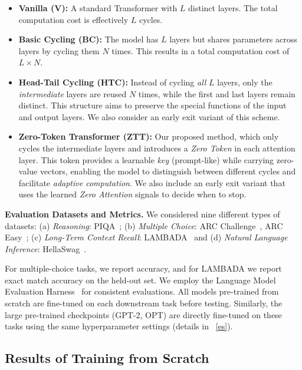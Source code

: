 \begin{itemize}[leftmargin=*]
    \item \textbf{Vanilla (V):} A standard Transformer with $L$ distinct layers. The total computation cost is effectively $L$ cycles.
    \item \textbf{Basic Cycling (BC):} The model has $L$ layers but shares parameters across layers by cycling them $N$ times. This results in a total computation cost of $L \times N$. 
    \item \textbf{Head-Tail Cycling (HTC):} Instead of cycling \emph{all} $L$ layers, only the \emph{intermediate} layers are reused $N$ times, while the first and last layers remain distinct. This structure aims to preserve the special functions of the input and output layers. We also consider an early exit variant of {this scheme.}
    \item \textbf{Zero-Token Transformer (ZTT):} Our proposed method, which only cycles the intermediate layers and introduces a \emph{Zero Token} in each attention layer. This token provides a learnable \emph{key} (prompt-like) while carrying zero-value vectors, enabling the model to distinguish between different cycles and facilitate \emph{adaptive computation}. {We also include an {early exit} variant } that uses the learned \emph{Zero Attention} signals to decide when to stop.
\end{itemize}

\textbf{Evaluation Datasets and Metrics.}
We considered nine different types of datasets: 
(a) \textit{Reasoning}: PIQA~\cite{bisk2020piqa}; 
(b) \textit{Multiple Choice}: ARC Challenge~\cite{clark2018think}, ARC Easy~\cite{clark2018think}; 
(c) \textit{Long-Term Context Recall}: LAMBADA~\cite{paperno2016lambada} and 
(d) \textit{Natural Language Inference}: HellaSwag~\cite{zellers2019hellaswag}.

For multiple-choice tasks, we report {accuracy}, and for LAMBADA we report {exact match} accuracy on the held-out set. We employ the Language Model Evaluation Harness~\cite{eval-harness} for consistent evaluations. All models {pre-trained from scratch} are fine-tuned on each downstream task before testing. Similarly, the large pre-trained checkpoints (GPT-2, OPT) are directly fine-tuned on these tasks using the same hyperparameter settings (details in ~\cref{es}).

\vspace{-0.2em}


\subsection{Results of Training from Scratch}
\label{sec:exp_scratch}

